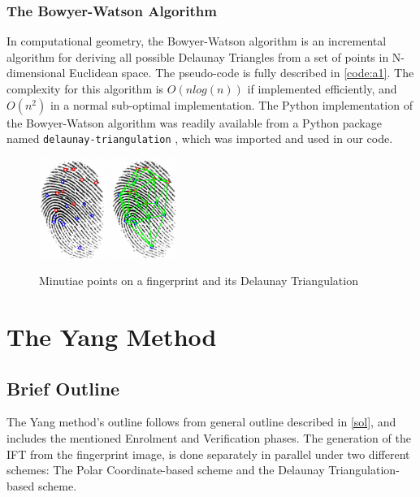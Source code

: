 \documentclass[fyp]{socreport}
\begin{document}
\subsubsection{The Bowyer-Watson Algorithm}
In computational geometry, the Bowyer-Watson algorithm is an incremental algorithm for deriving all possible Delaunay Triangles from a set of points in N-dimensional Euclidean space. The pseudo-code is fully described in \ref{code:a1}. The complexity for this algorithm is $O(n log(n))$ if implemented efficiently, and $O(n^2)$ in a normal sub-optimal implementation. The Python implementation of the Bowyer-Watson algorithm was readily available from a Python package named \texttt{delaunay-triangulation} \cite{delgit}, which was imported and used in our code.

\begin{figure}[H]
	\centering
	\includegraphics[width=0.2\textwidth]
	{minutiae_points}
	\includegraphics[width=0.191\textwidth]
	{minutiae_del}
	\caption{Minutiae points on a fingerprint and its Delaunay Triangulation}
\end{figure}

\section{The Yang Method}
\subsection{Brief Outline}
The Yang method's outline follows from general outline described in \ref{sol}, and includes the mentioned Enrolment and Verification phases. The generation of the IFT from the fingerprint image, is done separately in parallel under two different schemes: The Polar Coordinate-based scheme and the Delaunay Triangulation-based scheme.
\end{document}
